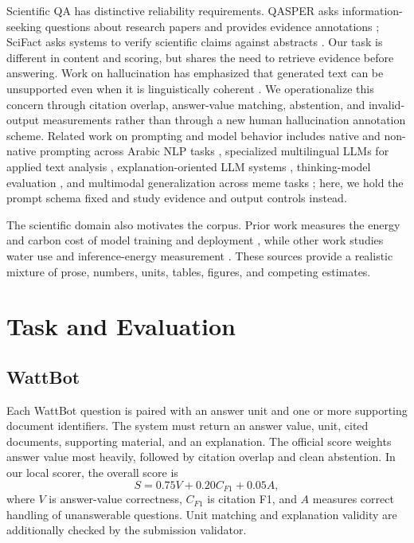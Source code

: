 \documentclass[11pt]{article}
\begin{document}
Scientific QA has distinctive reliability requirements. QASPER asks information-seeking questions about research papers and provides evidence annotations \citep{dasigi2021qasper}; SciFact asks systems to verify scientific claims against abstracts \citep{wadden2020scifact}. Our task is different in content and scoring, but shares the need to retrieve evidence before answering. Work on hallucination has emphasized that generated text can be unsupported even when it is linguistically coherent \citep{ji2023hallucination}. We operationalize this concern through citation overlap, answer-value matching, abstention, and invalid-output measurements rather than through a new human hallucination annotation scheme. Related work on prompting and model behavior includes native and non-native prompting across Arabic NLP tasks \citep{shahroor2025prompting}, specialized multilingual LLMs for applied text analysis \citep{kmainasi2025llamalens}, explanation-oriented LLM systems \citep{hasanain2025propxplain}, thinking-model evaluation \citep{kmainasi2026thinking}, and multimodal generalization across meme tasks \citep{shahroor2026memelens}; here, we hold the prompt schema fixed and study evidence and output controls instead.

The scientific domain also motivates the corpus. Prior work measures the energy and carbon cost of model training and deployment \citep{patterson2021carbon,dodge2022carbon,luccioni2024power}, while other work studies water use and inference-energy measurement \citep{li2023thirsty,samsi2023watts,chung2025mlenergy}. These sources provide a realistic mixture of prose, numbers, units, tables, figures, and competing estimates.

\section{Task and Evaluation}
\label{sec:task}
\subsection{WattBot}
Each WattBot question is paired with an answer unit and one or more supporting document identifiers. The system must return an answer value, unit, cited documents, supporting material, and an explanation. The official score weights answer value most heavily, followed by citation overlap and clean abstention. In our local scorer, the overall score is
\begin{equation}
 S = 0.75 V + 0.20 C_{F1} + 0.05 A,
\end{equation}
where $V$ is answer-value correctness, $C_{F1}$ is citation F1, and $A$ measures correct handling of unanswerable questions. Unit matching and explanation validity are additionally checked by the submission validator.
\end{document}
